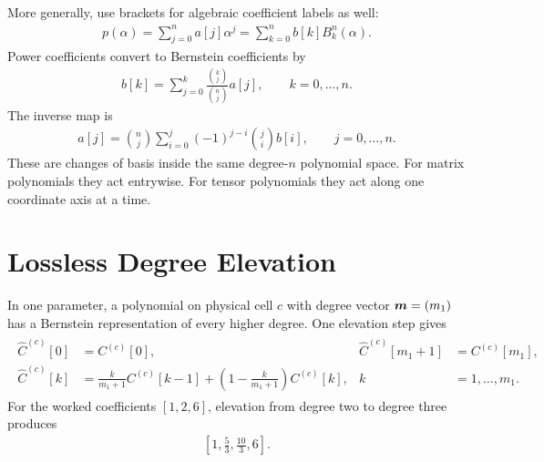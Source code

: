 More generally, use brackets for algebraic coefficient labels as well:
\begin{gather*}
p(\alpha)=\sum_{j=0}^{n}a[j]\alpha^j =\sum_{k=0}^{n}b[k]B_k^n(\alpha).
\end{gather*}
Power coefficients convert to Bernstein coefficients by
\begin{gather*}
b[k]=\sum_{j=0}^{k}
  \frac{\binom{k}{j}}{\binom{n}{j}}a[j],
  \qquad k=0,\ldots,n.
\end{gather*}
The inverse map is
\begin{gather*}
a[j]=\binom{n}{j}\sum_{i=0}^{j}
  (-1)^{j-i}\binom{j}{i}b[i],
  \qquad j=0,\ldots,n.
\end{gather*}
These are changes of basis inside the same degree-$n$ polynomial space. For matrix polynomials they act entrywise.  For tensor polynomials they act along one coordinate axis at a time.

\section{Lossless Degree Elevation}
\label{sec:bernstein-degree-elevation}

In one parameter, a polynomial on physical cell $c$ with degree vector $\boldsymbol{m}=(m_1)$ has a Bernstein representation of every higher degree. One elevation step gives
\begin{gather*}
\begin{aligned}
  \widehat C^{(c)}[0]&=C^{(c)}[0],
  &\widehat C^{(c)}[m_1+1]&=C^{(c)}[m_1],\\
  \widehat C^{(c)}[k]&=
    \frac{k}{m_1+1}C^{(c)}[k-1]
    +\left(1-\frac{k}{m_1+1}\right)C^{(c)}[k],
  &k&=1,\ldots,m_1.
\end{aligned}
\end{gather*}
For the worked coefficients $[1,2,6]$, elevation from degree two to degree three produces
\begin{gather*}
  \left[1,\frac53,\frac{10}{3},6\right].
\end{gather*}
\begin{center}
\end{center}

